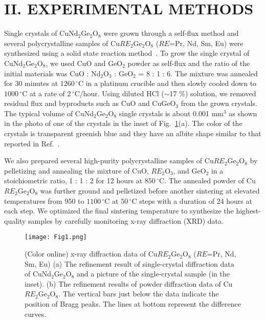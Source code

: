 \documentclass[aps,prl,reprint,amsmath,amssymb,superscriptaddress,showpacs]{revtex4-1}
\begin{document}
\section{II. EXPERIMENTAL METHODS}

Single crystals of CuNd$_2$Ge$_2$O$_8$ were grown through a self-flux method and several polycrystalline samples of Cu$RE_2$Ge$_2$O$_8$ ($RE$=Pr, Nd, Sm, Eu) were synthesized using a solid state reaction method~\cite{J.Campa1995}. To grow the single crystal of CuNd$_2$Ge$_2$O$_8$, we used CuO and GeO$_2$ powder as self-flux and the ratio of the initial materials was CuO : Nd$_2$O$_3$ : GeO$_2$ = 8 : 1 : 6. The mixture was annealed for 30 minutes at $1260\,^{\circ}\mathrm{C}$ in a platinum crucible and then slowly cooled down to $1000\,^{\circ}\mathrm{C}$ at a rate of $2\,^{\circ}\mathrm{C}$/hour. Using diluted HCl ($\sim$17 \%) solution, we removed residual flux and byproducts such as CuO and CuGeO$_3$ from the grown crystals. The typical volume of CuNd$_2$Ge$_2$O$_8$ single crystals is about 0.001 mm$^3$ as shown in the photo of one of the crystals in the inset of Fig.~\ref{fig1}(a). The color of the crystals is transparent greenish blue and they have an albite shape similar to that reported in Ref.~\cite{J.Campa1995}.

We also prepared several high-purity polycrystalline samples of Cu$RE_2$Ge$_2$O$_8$ by pelletizing and annealing the mixture of CuO, $RE_2$O$_3$, and GeO$_2$ in a stoichiometric ratio, 1 : 1 : 2 for 12 hours at $850\,^{\circ}\mathrm{C}$. The annealed powder of  Cu$RE_2$Ge$_2$O$_8$ was further ground and pelletized before another sintering at elevated temperatures from 950 to $1100\,^{\circ}\mathrm{C}$ at $50\,^{\circ}\mathrm{C}$ steps with a duration of 24 hours at each step. We optimized the final sintering temperature to synthesize the highest-quality samples by carefully monitoring x-ray diffraction (XRD) data. 

\begin{figure}[t]
\texttt{[image: Fig1.png]}
\caption{ \label{fig1}(Color online) x-ray diffraction data of Cu$RE_2$Ge$_2$O$_8$ ($RE$=Pr, Nd, Sm, Eu) (a) The refinement result of single-crystal diffraction data of CuNd$_2$Ge$_2$O$_8$ and a picture of the single-crystal sample (in the inset). (b) The refinement results of powder diffraction data of Cu$RE_2$Ge$_2$O$_8$. The vertical bars just below the data indicate the position of Bragg peaks. The lines at bottom represent the difference curves.}
\end{figure}
\end{document}
